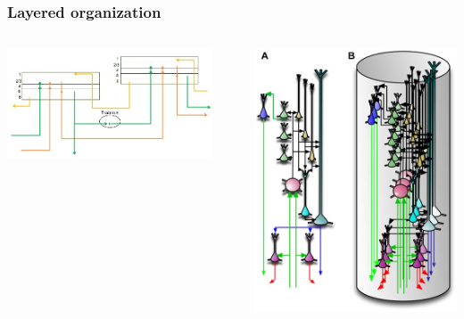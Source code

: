 \documentclass[default]{beamer}
\begin{document}
	\begin{frame}
		\frametitle{Layered organization}
		
		\begin{columns}
			\begin{column}{0.65\textwidth}
				\includegraphics[width=0.9\textwidth]{mpf/regions_connect}
			\end{column}
			\begin{column}{0.35\textwidth}
				\includegraphics[width=\textwidth]{phisio/column}
			\end{column}
		\end{columns}
	\end{frame}
			
\end{document}
